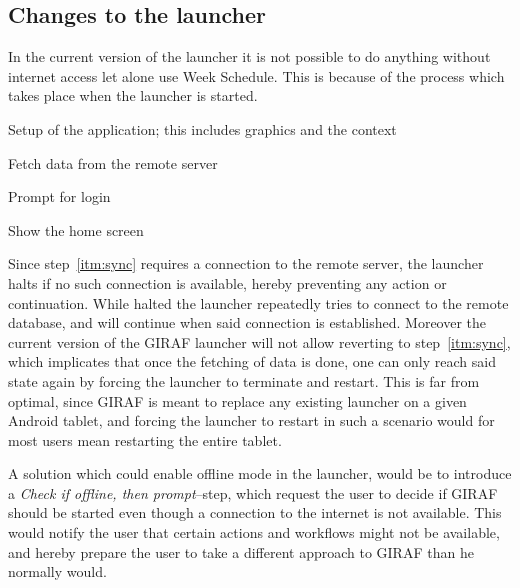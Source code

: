 \subsection{Changes to the launcher}
\label{sub:changes_to_the_launcher}
In the current version of the launcher it is not possible to do anything without internet access let alone use Week Schedule.
This is because of the process which takes place when the launcher is started.
\begin{enumberate}
    \item Setup of the application; this includes graphics and the context
    \item\label{itm:sync} Fetch data from the remote server
    \item Prompt for login
    \item Show the home screen
\end{enumberate}
Since step~\ref{itm:sync} requires a connection to the remote server, the launcher halts if no such connection is available, hereby preventing any action or continuation.
While halted the launcher repeatedly tries to connect to the remote database, and will continue when said connection is established.
Moreover the current version of the GIRAF launcher will not allow reverting to step~\ref{itm:sync}, which implicates that once the fetching of data is done, one can only reach said state again by forcing the launcher to terminate and restart.
This is far from optimal, since GIRAF is meant to replace any existing launcher on a given Android tablet, and forcing the launcher to restart in such a scenario would for most users mean restarting the entire tablet.

\bigskip

A solution which could enable offline mode in the launcher, would be to introduce a \textit{Check if offline, then prompt}--step, which request the user to decide if GIRAF should be started even though a connection to the internet is not available.
This would notify the user that certain actions and workflows might not be available, and hereby prepare the user to take a different approach to GIRAF than he normally would.

